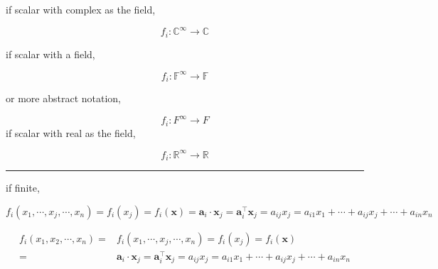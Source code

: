 \documentclass[
]{book}
\theoremstyle{definition}
\theoremstyle{definition}
\theoremstyle{definition}
\theoremstyle{definition}
\theoremstyle{remark}
\begin{document}
if scalar with complex as the field,

\[
f_{{\scriptscriptstyle i}}:\mathbb{C}^{\infty}\rightarrow\mathbb{C}
\]

if scalar with a field,

\[
f_{{\scriptscriptstyle i}}:\mathbb{F}^{\infty}\rightarrow\mathbb{F}
\]

or more abstract notation,

\[
f_{{\scriptscriptstyle i}}:F^{\infty}\rightarrow F
\]
if scalar with real as the field,

\[
f_{{\scriptscriptstyle i}}:\mathbb{R}^{\infty}\rightarrow\mathbb{R}
\]

\begin{center}\rule{0.5\linewidth}{0.5pt}\end{center}

if finite,

\[
f_{{\scriptscriptstyle i}}\left(x_{{\scriptscriptstyle 1}},\cdots,x_{{\scriptscriptstyle j}},\cdots,x_{{\scriptscriptstyle n}}\right)=f_{{\scriptscriptstyle i}}\left(x_{{\scriptscriptstyle j}}\right)=f_{{\scriptscriptstyle i}}\left(\boldsymbol{x}\right)=\boldsymbol{a}_{{\scriptscriptstyle i}}\cdot\boldsymbol{x}_{{\scriptscriptstyle j}}=\boldsymbol{a}_{{\scriptscriptstyle i}}^{\intercal}\boldsymbol{x}_{{\scriptscriptstyle j}}=a_{{\scriptscriptstyle ij}}x_{{\scriptscriptstyle j}}=a_{{\scriptscriptstyle i1}}x_{{\scriptscriptstyle 1}}+\cdots+a_{{\scriptscriptstyle ij}}x_{{\scriptscriptstyle j}}+\cdots+a_{{\scriptscriptstyle in}}x_{{\scriptscriptstyle n}}
\]

\[
\begin{aligned}
f_{{\scriptscriptstyle i}}\left(x_{{\scriptscriptstyle 1}},x_{{\scriptscriptstyle 2}},\cdots,x_{{\scriptscriptstyle n}}\right)= & f_{{\scriptscriptstyle i}}\left(x_{{\scriptscriptstyle 1}},\cdots,x_{{\scriptscriptstyle j}},\cdots,x_{{\scriptscriptstyle n}}\right)=f_{{\scriptscriptstyle i}}\left(x_{{\scriptscriptstyle j}}\right)=f_{{\scriptscriptstyle i}}\left(\boldsymbol{x}\right)\\
= & \boldsymbol{a}_{{\scriptscriptstyle i}}\cdot\boldsymbol{x}_{{\scriptscriptstyle j}}=\boldsymbol{a}_{{\scriptscriptstyle i}}^{\intercal}\boldsymbol{x}_{{\scriptscriptstyle j}}=a_{{\scriptscriptstyle ij}}x_{{\scriptscriptstyle j}}=a_{{\scriptscriptstyle i1}}x_{{\scriptscriptstyle 1}}+\cdots+a_{{\scriptscriptstyle ij}}x_{{\scriptscriptstyle j}}+\cdots+a_{{\scriptscriptstyle in}}x_{{\scriptscriptstyle n}}
\end{aligned}
\]
\end{document}
